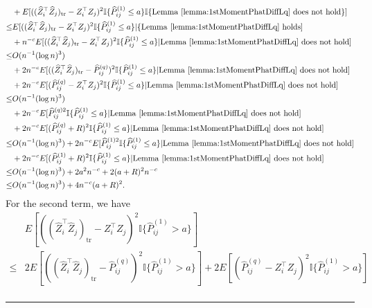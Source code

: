 \documentclass[a4paper]{article}
\newenvironment{proof}{{\bf Proof:  }}{\hfill\rule{2mm}{2mm}}
\renewcommand{\hat}{\widehat}
\begin{document}
\begin{proof}
\begin{align*}
	& + E[((\hat{Z}_i^{\top} \hat{Z}_j)_{\mathrm{tr}} - Z_i^{\top} Z_j)^2 \mathbb{I}\{\hat{P}^{(1)}_{ij} \le a\} \mathbb{I}\{\mathrm{Lemma\ } \ref{lemma:1stMomentPhatDiffLq} \mathrm{\ does\ not\ hold}\}] \\
	\le & E[((\hat{Z}_i^{\top} \hat{Z}_j)_{\mathrm{tr}} - Z_i^{\top} Z_j)^2 \mathbb{I}\{\hat{P}^{(1)}_{ij} \le a\} |\{\mathrm{Lemma\ } \ref{lemma:1stMomentPhatDiffLq} \mathrm{\ holds}] \\
	& + n^{-c} E[((\hat{Z}_i^{\top} \hat{Z}_j)_{\mathrm{tr}} - Z_i^{\top} Z_j)^2 \mathbb{I}\{\hat{P}^{(1)}_{ij} \le a\} | \mathrm{Lemma\ } \ref{lemma:1stMomentPhatDiffLq} \mathrm{\ does\ not\ hold}] \\
	\le & O(n^{-1} (\log n)^3) \\
	& + 2 n^{-c} E[((\hat{Z}_i^{\top} \hat{Z}_j)_{\mathrm{tr}} - \hat{P}^{(q)}_{ij})^2 \mathbb{I}\{\hat{P}^{(1)}_{ij} \le a\} | \mathrm{Lemma\ } \ref{lemma:1stMomentPhatDiffLq} \mathrm{\ does\ not\ hold}] \\
	& + 2 n^{-c} E[(\hat{P}^{(q)}_{ij} - Z_i^{\top} Z_j)^2 \mathbb{I}\{\hat{P}^{(1)}_{ij} \le a\} | \mathrm{Lemma\ } \ref{lemma:1stMomentPhatDiffLq} \mathrm{\ does\ not\ hold}] \\
	\le & O(n^{-1} (\log n)^3) \\
	& + 2 n^{-c} E[\hat{P}^{(q)2}_{ij} \mathbb{I}\{\hat{P}^{(1)}_{ij} \le a\} | \mathrm{Lemma\ } \ref{lemma:1stMomentPhatDiffLq} \mathrm{\ does\ not\ hold}] \\
	& + 2 n^{-c} E[(\hat{P}^{(q)}_{ij} + R)^2 \mathbb{I}\{\hat{P}^{(1)}_{ij} \le a\} | \mathrm{Lemma\ } \ref{lemma:1stMomentPhatDiffLq} \mathrm{\ does\ not\ hold}] \\
	\le & O(n^{-1} (\log n)^3)
	+ 2 n^{-c} E[\hat{P}^{(1)2}_{ij} \mathbb{I}\{\hat{P}^{(1)}_{ij} \le a\} | \mathrm{Lemma\ } \ref{lemma:1stMomentPhatDiffLq} \mathrm{\ does\ not\ hold}] \\
	& + 2 n^{-c} E[(\hat{P}^{(1)}_{ij} + R)^2 \mathbb{I}\{\hat{P}^{(1)}_{ij} \le a\} | \mathrm{Lemma\ } \ref{lemma:1stMomentPhatDiffLq} \mathrm{\ does\ not\ hold}] \\
	\le & O(n^{-1} (\log n)^3) + 2 a^2 n^{-c} + 2 (a+R)^2 n^{-c} \\
	\le & O(n^{-1} (\log n)^3) + 4 n^{-c} (a + R)^2.
\end{align*}
For the second term, we have
\begin{align*}
	& E[((\hat{Z}_i^{\top} \hat{Z}_j)_{\mathrm{tr}} - Z_i^{\top} Z_j)^2 \mathbb{I}\{\hat{P}^{(1)}_{ij} > a\}] \\
	\le & 2 E[((\hat{Z}_i^{\top} \hat{Z}_j)_{\mathrm{tr}} - \hat{P}^{(q)}_{ij})^2 \mathbb{I}\{\hat{P}^{(1)}_{ij} > a\}] + 2 E[(\hat{P}^{(q)}_{ij} - Z_i^{\top} Z_j)^2 \mathbb{I}\{\hat{P}^{(1)}_{ij} > a\}] \\

\end{align*}
\end{proof}
\end{document}
